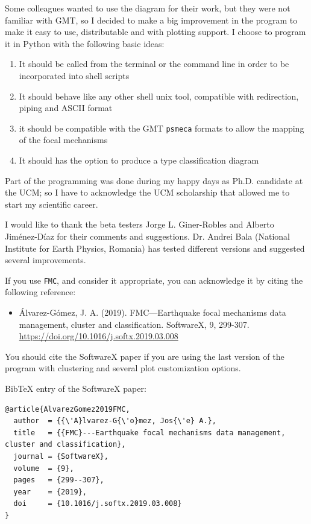 \documentclass[11pt,a4paper,english]{article}
\numberwithin{equation}{section}
\begin{document}
Some colleagues wanted to use the diagram for their work, but they
were not familiar with GMT, so I decided to make a big improvement
in the program to make it easy to use, distributable and with plotting
support. I choose to program it in Python with the following basic
ideas:
\begin{enumerate}
\item It should be called from the terminal or the command line in order
to be incorporated into shell scripts
\item It should behave like any other shell unix tool, compatible with redirection,
piping and ASCII format
\item it should be compatible with the GMT \texttt{psmeca} formats to allow
the mapping of the focal mechanisms
\item It should has the option to produce a \citet{kave96} type classification
diagram
\end{enumerate}
Part of the programming was done during my happy days as Ph.D. candidate
at the UCM; so I have to acknowledge the UCM scholarship that allowed
me to start my scientific career.

I would like to thank the beta testers Jorge L. Giner-Robles and Alberto
Jiménez-Díaz for their comments and suggestions. Dr. Andrei Bala (National
Institute for Earth Physics, Romania) has tested different versions
and suggested several improvements.

\bigskip{}

If you use \texttt{FMC}, and consider it appropriate, you can acknowledge
it by citing the following reference:
\begin{itemize}
\item Álvarez-Gómez, J. A. (2019). FMC---Earthquake focal mechanisms data
management, cluster and classification. SoftwareX, 9, 299-307. \url{https://doi.org/10.1016/j.softx.2019.03.008}
\end{itemize}
You should cite the SoftwareX paper if you are using the last version
of the program with clustering and several plot customization options.

BibTeX entry of the SoftwareX paper:

\begin{lstlisting}
@article{AlvarezGomez2019FMC,
  author  = {{\'A}lvarez-G{\'o}mez, Jos{\'e} A.},
  title   = {{FMC}---Earthquake focal mechanisms data management, cluster and classification},
  journal = {SoftwareX},
  volume  = {9},
  pages   = {299--307},
  year    = {2019},
  doi     = {10.1016/j.softx.2019.03.008}
}
\end{lstlisting}
\end{document}
